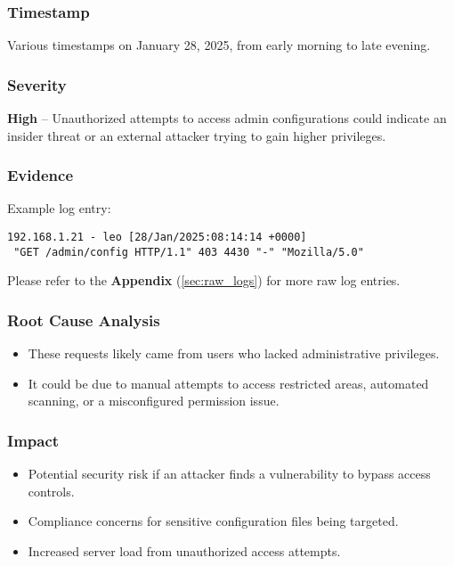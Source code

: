 \documentclass[11pt]{article}
\begin{document}
\subsubsection{Timestamp}
Various timestamps on January 28, 2025, from early morning to late evening.

\subsubsection{Severity}
\textbf{High} – Unauthorized attempts to access admin configurations could indicate an insider threat or an external attacker trying to gain higher privileges.

\subsubsection{Evidence}
Example log entry:
\begin{verbatim}
192.168.1.21 - leo [28/Jan/2025:08:14:14 +0000]
 "GET /admin/config HTTP/1.1" 403 4430 "-" "Mozilla/5.0"
\end{verbatim}

Please refer to the \textbf{Appendix} (\ref{sec:raw_logs}) for more raw log entries.

\subsubsection{Root Cause Analysis}
\begin{itemize}
    \item These requests likely came from users who lacked administrative privileges.
    \item It could be due to manual attempts to access restricted areas, automated scanning, or a misconfigured permission issue.
\end{itemize}

\subsubsection{Impact}
\begin{itemize}
    \item Potential security risk if an attacker finds a vulnerability to bypass access controls.
    \item Compliance concerns for sensitive configuration files being targeted.
    \item Increased server load from unauthorized access attempts.
\end{itemize}
\end{document}
